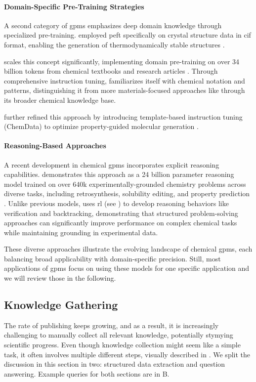 \paragraph{Domain-Specific Pre-Training Strategies} A second category of \glspl{gpm} emphasizes deep domain knowledge through specialized pre-training.  employed \gls{peft} specifically on crystal structure data in \gls{cif} format, enabling the generation of thermodynamically stable structures \autocite{mishra2024foundational}.

 scales this concept significantly, implementing domain pre-training on over 34 billion tokens from chemical textbooks and research articles \autocite{zhao2024chemdfm}. Through comprehensive instruction tuning,  familiarizes itself with chemical notation and patterns, distinguishing it from more materials-focused approaches like  through its broader chemical knowledge base.

 further refined this approach by introducing template-based instruction tuning (ChemData) to optimize property-guided molecular generation \autocite{zhang2024chemllm}.

\paragraph{Reasoning-Based Approaches} A recent development in chemical \glspl{gpm} incorporates explicit reasoning capabilities.  demonstrates this approach as a 24 billion parameter reasoning model trained on over 640k experimentally-grounded chemistry problems across diverse tasks, including retrosynthesis, solubility editing, and property prediction \autocite{narayanan2025training}. 
Unlike previous models,  uses \gls{rl} (see ) to develop reasoning behaviors like verification and backtracking, demonstrating that structured problem-solving approaches can significantly improve performance on complex chemical tasks while maintaining grounding in experimental data.

These diverse approaches illustrate the evolving landscape of chemical \glspl{gpm}, each balancing broad applicability with domain-specific precision.
Still, most applications of \glspl{gpm} focus on using these models for one specific application and we will review those in the following.

\subsection{Knowledge Gathering}\label{sec:information_gathering}
The rate of publishing keeps growing, and as a result, it is increasingly challenging to manually collect all relevant knowledge, potentially stymying scientific progress.\autocite{schilling2025text, Chu_2021}
Even though knowledge collection might seem like a simple task, it often involves multiple different steps, visually described in . We split the discussion in this section in two: structured data extraction and question answering. Example queries for both sections are in B.

